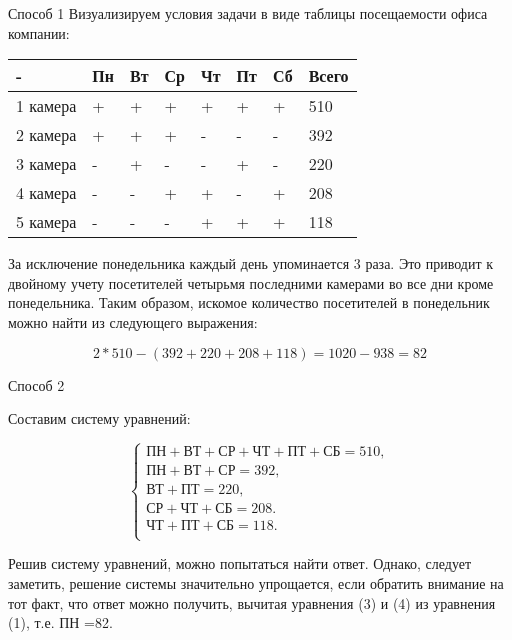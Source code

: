 \solutionSection
Способ 1
Визуализируем условия задачи в виде таблицы посещаемости офиса компании:

\begin{tabular}{ | l | l | l | l | l | l | l | l |}
\hline
  -      & Пн & Вт & Ср & Чт & Пт & Сб & Всего \\ \hline
1 камера & + & + & + & + & + & + & 510 \\
2 камера & + & + & + & - & - & - & 392 \\
3 камера & - & + & - & - & + & - & 220 \\
4 камера & - & - & + & + & - & + & 208 \\
5 камера & - & - & - & + & + & + & 118 \\
\hline
\end{tabular}

За исключение понедельника каждый день упоминается 3 раза. Это приводит к двойному учету посетителей четырьмя последними камерами во все дни кроме понедельника. Таким образом, искомое количество посетителей в понедельник можно найти из следующего выражения:

\begin{displaymath}
2*510-(392+220+208+118)=1020-938=82
\end{displaymath}

Способ 2

Составим систему уравнений:

\begin{equation*}
   \begin{cases}
    \text{ПН}+\text{ВТ}+\text{СР}+\text{ЧТ}+\text{ПТ}+\text{СБ}=510,\\
    \text{ПН}+\text{ВТ}+\text{СР} =392, \\
    \text{ВТ}+ \text{ПТ}=220, \\
    \text{СР}+\text{ЧТ}+ \text{СБ}=208. \\
    \text{ЧТ}+\text{ПТ}+\text{СБ}=118. \\ 
   \end{cases}
  \end{equation*}

Решив систему уравнений, можно попытаться найти ответ. Однако, следует заметить, решение системы значительно упрощается, если обратить внимание на тот факт, что ответ можно получить, вычитая уравнения (3) и (4) из уравнения (1), т.е. ПН =82.
